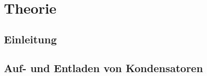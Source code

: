 \section{Theorie}
\label{sec:Theorie}

\subsection{Einleitung}

\subsection{Auf- und Entladen von Kondensatoren}
\label{sub:AufUndAb}
